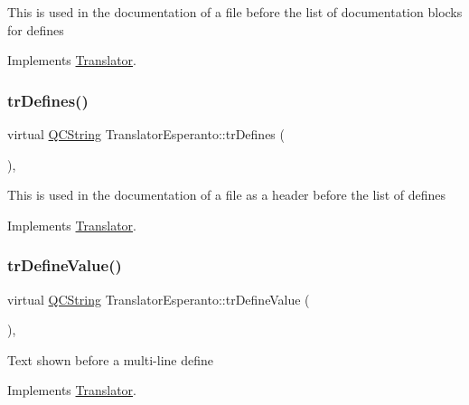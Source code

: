 This is used in the documentation of a file before the list of documentation blocks for defines 

Implements \mbox{\hyperlink{class_translator}{Translator}}.

\mbox{\label{class_translator_esperanto_ad11e7d859d5f65bb8a7b103c16199677}} 
\subsubsection{\texorpdfstring{trDefines()}{trDefines()}}
{\footnotesize\ttfamily virtual \mbox{\hyperlink{class_q_c_string}{Q\+C\+String}} Translator\+Esperanto\+::tr\+Defines (\begin{DoxyParamCaption}{ }\end{DoxyParamCaption})\hspace{0.3cm}{\ttfamily [inline]}, {\ttfamily [virtual]}}

This is used in the documentation of a file as a header before the list of defines 

Implements \mbox{\hyperlink{class_translator}{Translator}}.

\mbox{\label{class_translator_esperanto_a39f666357409aac0485e92bb5cbc7548}} 
\subsubsection{\texorpdfstring{trDefineValue()}{trDefineValue()}}
{\footnotesize\ttfamily virtual \mbox{\hyperlink{class_q_c_string}{Q\+C\+String}} Translator\+Esperanto\+::tr\+Define\+Value (\begin{DoxyParamCaption}{ }\end{DoxyParamCaption})\hspace{0.3cm}{\ttfamily [inline]}, {\ttfamily [virtual]}}

Text shown before a multi-\/line define 

Implements \mbox{\hyperlink{class_translator}{Translator}}.

\mbox{\label{class_translator_esperanto_a749b791bb5fad96fd98f42f570c50fb1}} 
